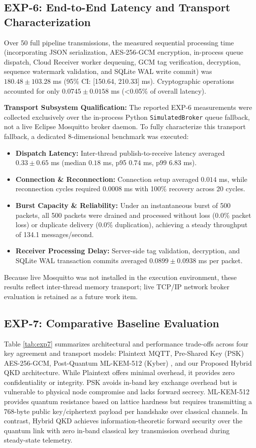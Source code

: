 \documentclass[journal,10pt,twocolumn]{article}
\begin{document}
\subsection{EXP-6: End-to-End Latency and Transport Characterization}
Over 50 full pipeline transmissions, the measured sequential processing time (incorporating JSON serialization, AES-256-GCM encryption, in-process queue dispatch, Cloud Receiver worker dequeuing, GCM tag verification, decryption, sequence watermark validation, and SQLite WAL write commit) was $180.48 \pm 103.28$ ms (95\% CI: [150.64, 210.33] ms). Cryptographic operations accounted for only $0.0745 \pm 0.0158$ ms (<0.05\% of overall latency).

\textbf{Transport Subsystem Qualification:} The reported EXP-6 measurements were collected exclusively over the in-process Python \texttt{SimulatedBroker} queue fallback, not a live Eclipse Mosquitto broker daemon. To fully characterize this transport fallback, a dedicated 8-dimensional benchmark was executed:
\begin{itemize}
    \item \textbf{Dispatch Latency:} Inter-thread publish-to-receive latency averaged $0.33 \pm 0.65$ ms (median $0.18$ ms, p95 $0.74$ ms, p99 $6.83$ ms).
    \item \textbf{Connection \& Reconnection:} Connection setup averaged $0.014$ ms, while reconnection cycles required $0.0008$ ms with 100\% recovery across 20 cycles.
    \item \textbf{Burst Capacity \& Reliability:} Under an instantaneous burst of 500 packets, all 500 packets were drained and processed without loss (0.0\% packet loss) or duplicate delivery (0.0\% duplication), achieving a steady throughput of 134.1 messages/second.
    \item \textbf{Receiver Processing Delay:} Server-side tag validation, decryption, and SQLite WAL transaction commits averaged $0.0899 \pm 0.0938$ ms per packet.
\end{itemize}
Because live Mosquitto was not installed in the execution environment, these results reflect inter-thread memory transport; live TCP/IP network broker evaluation is retained as a future work item.

\subsection{EXP-7: Comparative Baseline Evaluation}
Table \ref{tab:exp7} summarizes architectural and performance trade-offs across four key agreement and transport models: Plaintext MQTT, Pre-Shared Key (PSK) AES-256-GCM, Post-Quantum ML-KEM-512 (Kyber) \cite{nist2024fips203}, and our Proposed Hybrid QKD architecture. While Plaintext offers minimal overhead, it provides zero confidentiality or integrity. PSK avoids in-band key exchange overhead but is vulnerable to physical node compromise and lacks forward secrecy. ML-KEM-512 provides quantum resistance based on lattice hardness but requires transmitting a 768-byte public key/ciphertext payload per handshake over classical channels. In contrast, Hybrid QKD achieves information-theoretic forward security over the quantum link with zero in-band classical key transmission overhead during steady-state telemetry.
\end{document}
